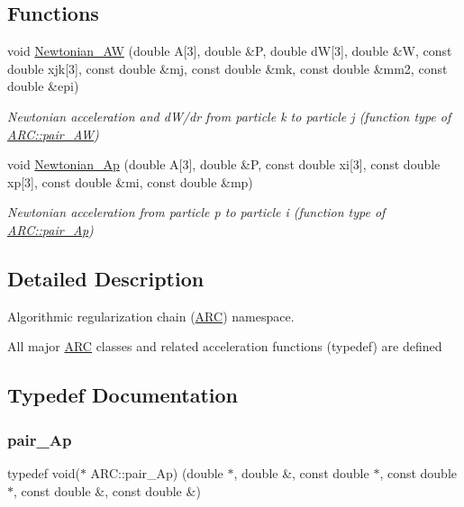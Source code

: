 \subsection*{Functions}
\begin{DoxyCompactItemize}
\item 
void \hyperlink{namespaceARC_a3c3f20df43ba5df3e21857643130d784}{Newtonian\+\_\+\+AW} (double A\mbox{[}3\mbox{]}, double \&P, double dW\mbox{[}3\mbox{]}, double \&W, const double xjk\mbox{[}3\mbox{]}, const double \&mj, const double \&mk, const double \&mm2, const double \&epi)
\begin{DoxyCompactList}\small\item\em Newtonian acceleration and d\+W/dr from particle k to particle j (function type of \hyperlink{namespaceARC_adbfc7c72ce3d25363148027db0641abf}{A\+R\+C\+::pair\+\_\+\+AW}) \end{DoxyCompactList}\item 
void \hyperlink{namespaceARC_a6b8ee871e0832b6b59968ea9069877e0}{Newtonian\+\_\+\+Ap} (double A\mbox{[}3\mbox{]}, double \&P, const double xi\mbox{[}3\mbox{]}, const double xp\mbox{[}3\mbox{]}, const double \&mi, const double \&mp)
\begin{DoxyCompactList}\small\item\em Newtonian acceleration from particle p to particle i (function type of \hyperlink{namespaceARC_a819446c4644b3a3af7ef11574d0b55e0}{A\+R\+C\+::pair\+\_\+\+Ap}) \end{DoxyCompactList}\end{DoxyCompactItemize}


\subsection{Detailed Description}
Algorithmic regularization chain (\hyperlink{namespaceARC}{A\+RC}) namespace. 

All major \hyperlink{namespaceARC}{A\+RC} classes and related acceleration functions (typedef) are defined 

\subsection{Typedef Documentation}
\hypertarget{namespaceARC_a819446c4644b3a3af7ef11574d0b55e0}{}\label{namespaceARC_a819446c4644b3a3af7ef11574d0b55e0} 
\subsubsection{\texorpdfstring{pair\+\_\+\+Ap}{pair\_Ap}}
{\footnotesize\ttfamily typedef void($\ast$ A\+R\+C\+::pair\+\_\+\+Ap) (double $\ast$, double \&, const double $\ast$, const double $\ast$, const double \&, const double \&)}



